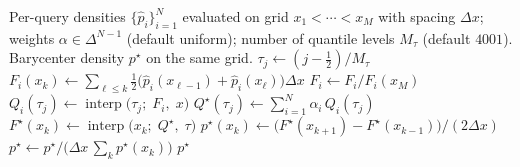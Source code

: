 \documentclass[11pt]{article}
\theoremstyle{plain}
\theoremstyle{definition}
\theoremstyle{remark}
\begin{document}
\begin{algorithm}[t]
\caption{Weighted 2-Wasserstein barycenter of $N$ densities on a common
grid.}
\label{alg:ot-barycenter}
\begin{algorithmic}[1]
\Require Per-query densities
$\{\hat{p}_i\}_{i=1}^{N}$ evaluated on grid
$x_1 < \cdots < x_M$ with spacing $\Delta x$; weights
$\alpha \in \Delta^{N-1}$ (default uniform); number of quantile levels
$M_\tau$ (default $4001$).
\Ensure Barycenter density $p^\star$ on the same grid.
\State $\tau_j \gets (j - \tfrac{1}{2}) / M_\tau$ 
    \State $F_i(x_k) \gets \sum_{\ell \le k} \tfrac{1}{2}\bigl(\hat{p}_i(x_{\ell-1}) + \hat{p}_i(x_\ell)\bigr) \Delta x$
    \State $F_i \gets F_i / F_i(x_M)$
    \State $Q_i(\tau_j) \gets \operatorname{interp}\bigl(\tau_j;\; F_i,\; x\bigr)$
\EndFor
\State $Q^\star(\tau_j) \gets \sum_{i=1}^{N} \alpha_i\, Q_i(\tau_j)$
\State $F^\star(x_k) \gets \operatorname{interp}\bigl(x_k;\; Q^\star,\; \tau\bigr)$
\State $p^\star(x_k) \gets \bigl(F^\star(x_{k+1}) - F^\star(x_{k-1})\bigr) / (2 \Delta x)$
\State $p^\star \gets p^\star / \bigl(\Delta x\, \sum_k p^\star(x_k)\bigr)$
\State \Return $p^\star$
\end{algorithmic}
\end{algorithm}



\end{document}
